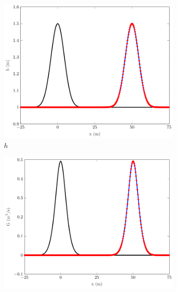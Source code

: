 \documentclass[10pt]{elsarticle}
\begin{document}

\begin{figure}
	\centering
	\begin{subfigure}{0.32\textwidth}
		\centering
		\includegraphics[width=\textwidth]{./Figures/Simulations/Validation/Forced/h.pdf}
		\caption{$h$}
	\end{subfigure}
	\begin{subfigure}{0.32\textwidth}
		\centering
		\includegraphics[width=\textwidth]{./Figures/Simulations/Validation/Forced/G.pdf}

\end{subfigure}
\end{figure}
\end{document}
